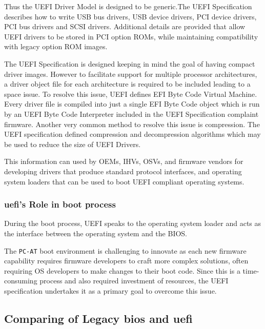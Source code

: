 Thus the UEFI Driver Model is designed to be generic.The UEFI Specification describes how to write USB bus drivers, USB device drivers, PCI device drivers, PCI bus drivers and SCSI drivers.
Additional details are provided that allow UEFI drivers to be stored in PCI option ROMs, while maintaining compatibility with legacy option ROM images.

The UEFI Specification is designed keeping in mind the goal of having compact driver images. However to facilitate support for multiple processor architectures, a driver object file for each architecture is required to be included leading to a space issue. To resolve this issue, UEFI defines EFI Byte Code Virtual Machine. Every driver file is compiled into just a single EFI Byte Code object which is run by an UEFI Byte Code Interpreter included in the UEFI Specification complaint firmware. Another very common method to resolve this issue is compression. The UEFI specification defined compression and decompression algorithms which may be used to reduce the size of UEFI Drivers.

This information can used by OEMs, IHVs, OSVs, and firmware vendors for developing drivers that produce standard protocol interfaces, and operating system loaders that can be used to boot UEFI compliant operating systems.

\subsubsection{\gls{uefi}'s Role in boot process}

During the boot process, UEFI speaks to the operating system loader and acts as the interface between the operating system and the BIOS.

The \verb|PC-AT| boot environment is challenging to innovate as each new firmware capability requires firmware developers to craft more complex solutions, often requiring OS developers to make changes to their boot code. Since this is a time-consuming process and also required investment of resources, the UEFI specification undertakes it as a primary goal to overcome this issue.

\subsection{Comparing of Legacy \gls{bios} and \gls{uefi}}

